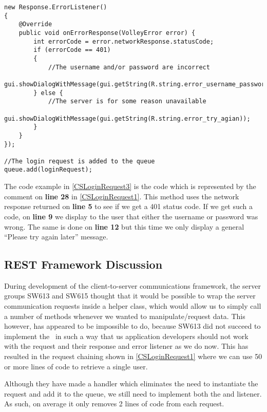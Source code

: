 \begin{minipage}[H]{\linewidth}
\begin{lstlisting}[caption = Using an \ttt{ErrorListener} to detect mishaps in the \ttt{LoginRequest}, label = CSLoginRequest3] 
new Response.ErrorListener() 
{
	@Override
    public void onErrorResponse(VolleyError error) {
        int errorCode = error.networkResponse.statusCode;
        if (errorCode == 401) 
        {
        	//The username and/or password are incorrect
            gui.showDialogWithMessage(gui.getString(R.string.error_username_password));
        } else {
            //The server is for some reason unavailable
            gui.showDialogWithMessage(gui.getString(R.string.error_try_agian));
        }
    }
});

//The login request is added to the queue
queue.add(loginRequest);
\end{lstlisting}
\end{minipage}

The code example in \autoref{CSLoginRequest3} is the code which is represented
by the comment on \textbf{line 28} in \autoref{CSLoginRequest1}.
This method uses the network response returned on \textbf{line 5} to see
if we get a 401 status code. If we get such a code, on \textbf{line 9} we
display to the user that either the username or password was wrong. The same is
done on \textbf{line 12} but this time we only display a general ``Please try
again later'' message.


\subsection{REST Framework Discussion}
During development of the client-to-server communications framework, the server
groups SW613 and SW615 thought that it would be possible to wrap the server
communication requests inside a helper class, which would allow us to simply
call a number of methods whenever we wanted to manipulate/request data. This
however, has appeared to be impossible to do, because SW613 did not succeed to
implement the \rlib\ in such a way that us application developers
should not work with the request and their response and error listener as we do
now. This has resulted in the request chaining shown in
\autoref{CSLoginRequest1} where we can use 50 or more lines of code to retrieve
a single user.\nl

Although they have made a handler which eliminates the need to instantiate the
request and add it to the queue, we still need to implement both the
 and  listener. As such, on average it only removes
2 lines of code from each request.\nl

